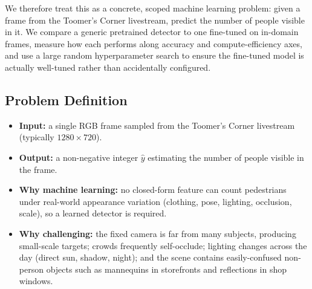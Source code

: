 \documentclass{article}
\begin{document}
We therefore treat this as a concrete, scoped machine learning
problem: given a frame from the Toomer's Corner livestream, predict
the number of people visible in it. We compare a generic pretrained
detector to one fine-tuned on in-domain frames, measure how each
performs along accuracy and compute-efficiency axes, and use a large
random hyperparameter search to ensure the fine-tuned model is
actually well-tuned rather than accidentally configured.

\subsection{Problem Definition}
\begin{itemize}[leftmargin=1.5em]
    \item \textbf{Input:} a single RGB frame sampled from the
    Toomer's Corner livestream (typically $1280\times720$).
    \item \textbf{Output:} a non-negative integer $\hat{y}$
    estimating the number of people visible in the frame.
    \item \textbf{Why machine learning:} no closed-form feature can
    count pedestrians under real-world appearance variation
    (clothing, pose, lighting, occlusion, scale), so a learned
    detector is required.
    \item \textbf{Why challenging:} the fixed camera is far from
    many subjects, producing small-scale targets; crowds frequently
    self-occlude; lighting changes across the day (direct sun,
    shadow, night); and the scene contains easily-confused
    non-person objects such as mannequins in storefronts and
    reflections in shop windows.
\end{itemize}
\end{document}
